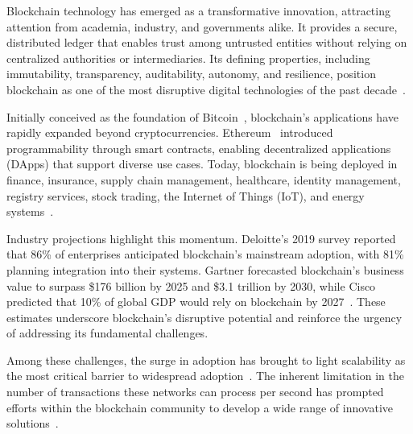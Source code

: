 
\vspace{12pt}

Blockchain technology has emerged as a transformative innovation, attracting attention from academia, industry, and governments alike. It provides a secure, distributed ledger that enables trust among untrusted entities without relying on centralized authorities or intermediaries. Its defining properties, including immutability, transparency, auditability, autonomy,  and resilience, position blockchain as one of the most disruptive digital technologies of the past decade~\cite{sanka2021systematic}.

\vspace{12pt}

Initially conceived as the foundation of Bitcoin~\cite{nakamoto2008bitcoin}, blockchain’s applications have rapidly expanded beyond cryptocurrencies. Ethereum~\cite{buterin2014ethereum} introduced programmability through smart contracts, enabling decentralized applications (DApps) that support diverse use cases. Today, blockchain is being deployed in finance, insurance, supply chain management, healthcare, identity management, registry services, stock trading, the Internet of Things (IoT), and energy systems~\cite{sanka2021systematic}.

\vspace{12pt}

Industry projections highlight this momentum. Deloitte’s 2019 survey reported that 86\% of enterprises anticipated blockchain’s mainstream adoption, with 81\% planning integration into their systems. Gartner forecasted blockchain’s business value to surpass \$176 billion by 2025 and \$3.1 trillion by 2030, while Cisco predicted that 10\% of global GDP would rely on blockchain by 2027~\cite{sanka2021systematic}. These estimates underscore blockchain’s disruptive potential and reinforce the urgency of addressing its fundamental challenges.

\vspace{12pt}

Among these challenges, the surge in adoption has brought to light scalability as the most critical barrier to widespread adoption~\cite{slogix2025scalability}. The inherent limitation in the number of transactions these networks can process per second has prompted efforts within the blockchain community to develop a wide range of innovative solutions~\cite{zkp2025rollups, alghamdi2024survey}.

